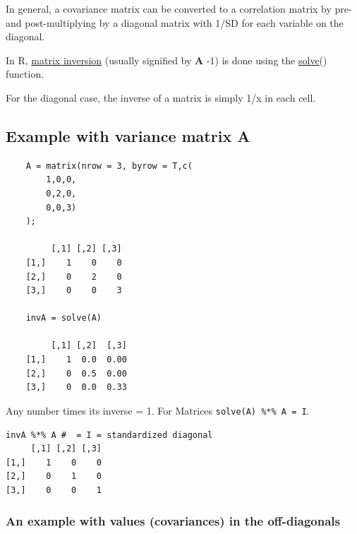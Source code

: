 \documentclass[11pt,]{article}
\begin{document}
In general, a covariance matrix can be converted to a correlation matrix
by pre- and post-multiplying by a diagonal matrix with 1/SD for each
variable on the diagonal.

In R, \href{https://en.wikipedia.org/wiki/Invertible_matrix}{matrix
inversion} (usually signified by \textbf{A} -1) is done using the
\href{http://openmx.psyc.virginia.edu/wiki/matrix-operators-and-functions}{solve}()
function.

For the diagonal case, the inverse of a matrix is simply 1/x in each
cell.

\subsection{Example with variance matrix
A}\label{example-with-variance-matrix-a}

\begin{verbatim}
    A = matrix(nrow = 3, byrow = T,c(
        1,0,0,
        0,2,0,
        0,0,3)
    ); 

         [,1] [,2] [,3]
    [1,]    1    0    0
    [2,]    0    2    0
    [3,]    0    0    3

    invA = solve(A)

         [,1] [,2]  [,3]
    [1,]    1  0.0  0.00
    [2,]    0  0.5  0.00
    [3,]    0  0.0  0.33
\end{verbatim}

Any number times its inverse = 1. For Matrices
\texttt{solve(A)\ \%*\%\ A\ =\ I}.

\begin{verbatim}
invA %*% A #  = I = standardized diagonal
     [,1] [,2] [,3]
[1,]    1    0    0
[2,]    0    1    0
[3,]    0    0    1
\end{verbatim}

\subsubsection{An example with values (covariances) in the
off-diagonals}\label{an-example-with-values-covariances-in-the-off-diagonals}
\end{document}
